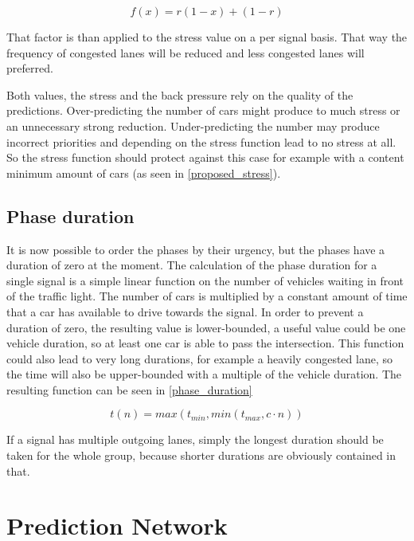 \begin{equation} \label{stress_reducer}
	f(x) = r (1 - x) + (1 - r)
\end{equation}

That factor is than applied to the stress value on a per signal basis. That way the frequency of congested lanes will be reduced and less congested lanes will preferred.

Both values, the stress and the back pressure rely on the quality of the predictions. Over-predicting the number of cars might produce to much stress or an unnecessary strong reduction. Under-predicting the number may produce incorrect priorities and depending on the stress function lead to no stress at all. So the stress function should protect against this case for example with a content minimum amount of cars (as seen in \autoref{proposed_stress}).

\subsection*{Phase duration}

It is now possible to order the phases by their urgency, but the phases have a duration of zero at the moment. The calculation of the phase duration for a single signal is a simple linear function on the number of vehicles waiting in front of the traffic light. The number of cars is multiplied by a constant amount of time that a car has available to drive towards the signal. In order to prevent a duration of zero, the resulting value is lower-bounded, a useful value could be one vehicle duration, so at least one car is able to pass the intersection. This function could also lead to very long durations, for example a heavily congested lane, so the time will also be upper-bounded with a multiple of the vehicle duration. The resulting function can be seen in \autoref{phase_duration}

\begin{equation} \label{phase_duration}
t(n)=max\left(t_{min}, min\left(t_{max}, c \cdot n\right)\right)
\end{equation}

If a signal has multiple outgoing lanes, simply the longest duration should be taken for the whole group, because shorter durations are obviously contained in that.

\section{Prediction Network}
\label{predictionNetwork}

